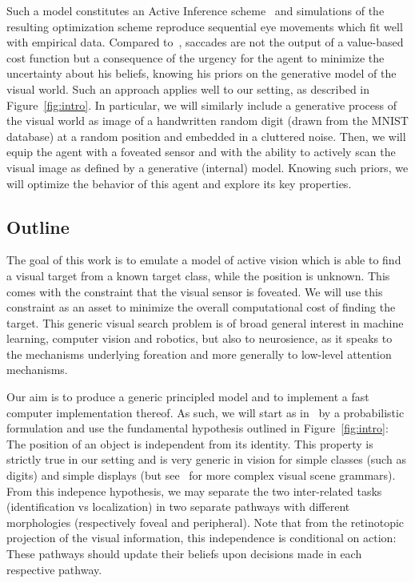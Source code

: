Such a model constitutes an Active Inference scheme~\citep{Mirza18} and simulations of the resulting optimization scheme reproduce sequential eye movements which fit well with empirical data. Compared to~\citet{Najemnik05}, saccades are not the output of a value-based cost function but a consequence of the urgency for the agent to minimize the uncertainty about his beliefs, knowing his priors on the generative model of the visual world. Such an approach applies well to our setting, as described in Figure~\ref{fig:intro}. In particular, we will similarly include a generative process of the visual world as image of a handwritten random digit (drawn from the MNIST database) at a random position and embedded in a cluttered noise. Then, we will equip the agent with a foveated sensor and with the ability to actively scan the visual image as defined by a generative (internal) model. Knowing such priors, we will optimize the behavior of this agent and explore its key properties.

\subsection{Outline}
The goal of this work is to emulate a model of active vision which is able to find a visual target from a known target class, while the position is unknown. This comes with the constraint that the visual sensor is foveated. We will use this constraint as an asset to minimize the overall computational cost of finding the target. This generic visual search problem is of broad general interest in machine learning, computer vision and robotics, but also to neurosience, as it speaks to the mechanisms underlying foreation and more generally to low-level attention mechanisms.

Our aim is to produce a generic principled model and to implement a fast computer implementation thereof. As such, we will start as in~\citep{Friston12} by a probabilistic formulation and use the fundamental hypothesis outlined in Figure~\ref{fig:intro}: The position of an object is independent from its identity. This property is strictly true in our setting and is very generic in vision for simple classes (such as digits) and simple displays (but see~\citep{Vo12} for more complex visual scene grammars). From this indepence hypothesis, we may separate the two inter-related tasks (identification vs localization) in two separate pathways with different morphologies (respectively foveal and peripheral). Note that from the retinotopic projection of the visual information, this independence is conditional on action: These pathways should update their beliefs upon decisions made in each respective pathway.

